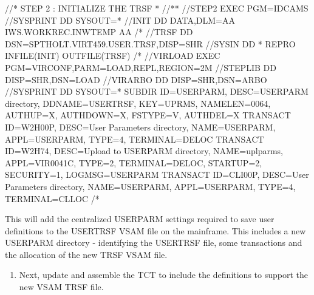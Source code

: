 \documentclass[letterpaper,10pt,english]{sphinxmanual}
\begin{document}
\begin{sphinxVerbatim}[commandchars=\\\{\}]
//* STEP 2 : INITIALIZE THE TRSF                                   *
//*\PYGZhy{}\PYGZhy{}\PYGZhy{}\PYGZhy{}\PYGZhy{}\PYGZhy{}\PYGZhy{}\PYGZhy{}\PYGZhy{}\PYGZhy{}\PYGZhy{}\PYGZhy{}\PYGZhy{}\PYGZhy{}\PYGZhy{}\PYGZhy{}\PYGZhy{}\PYGZhy{}\PYGZhy{}\PYGZhy{}\PYGZhy{}\PYGZhy{}\PYGZhy{}\PYGZhy{}\PYGZhy{}\PYGZhy{}\PYGZhy{}\PYGZhy{}\PYGZhy{}\PYGZhy{}\PYGZhy{}\PYGZhy{}\PYGZhy{}\PYGZhy{}\PYGZhy{}\PYGZhy{}\PYGZhy{}\PYGZhy{}\PYGZhy{}\PYGZhy{}\PYGZhy{}\PYGZhy{}\PYGZhy{}\PYGZhy{}\PYGZhy{}\PYGZhy{}\PYGZhy{}\PYGZhy{}\PYGZhy{}\PYGZhy{}\PYGZhy{}\PYGZhy{}\PYGZhy{}\PYGZhy{}\PYGZhy{}\PYGZhy{}\PYGZhy{}\PYGZhy{}\PYGZhy{}\PYGZhy{}\PYGZhy{}\PYGZhy{}\PYGZhy{}\PYGZhy{}*
//STEP2   EXEC PGM=IDCAMS
//SYSPRINT DD  SYSOUT=*
//INIT     DD  DATA,DLM=AA
\PYGZdl{}\PYGZdl{}\PYGZdl{}\PYGZdl{}IWS.WORKREC.INW\PYGZdl{}TEMP
AA
/*
//TRSF     DD DSN=SPTHOLT.VIRT459.USER.TRSF,DISP=SHR
//SYSIN    DD *
REPRO INFILE(INIT) OUTFILE(TRSF)
/*
//VIRLOAD EXEC PGM=VIRCONF,PARM=\PYGZsq{}LOAD,REPL\PYGZsq{},REGION=2M
//STEPLIB  DD  DISP=SHR,DSN=\PYGZam{}LOAD
//VIRARBO  DD  DISP=SHR,DSN=\PYGZam{}ARBO
//SYSPRINT DD  SYSOUT=*
      SUBDIR   ID=USERPARM,
               DESC=\PYGZsq{}USERPARM directory\PYGZsq{},
               DDNAME=USERTRSF,
               KEY=UPRMS,
               NAMELEN=0064,
               AUTHUP=X,
               AUTHDOWN=X,
               FSTYPE=V,
               AUTHDEL=X
      TRANSACT ID=W2H\PYGZhy{}00P,
               DESC=\PYGZsq{}User Parameters directory\PYGZsq{},
               NAME=USERPARM,
               APPL=USERPARM,
               TYPE=4,
               TERMINAL=DELOC
      TRANSACT ID=W2H\PYGZhy{}74,
               DESC=\PYGZsq{}Upload to USERPARM directory\PYGZsq{},
               NAME=uplparms,
               APPL=VIR0041C,
               TYPE=2,
               TERMINAL=DELOC,
               STARTUP=2,
               SECURITY=1,
               LOGMSG=USERPARM
      TRANSACT ID=CLI\PYGZhy{}00P,
               DESC=\PYGZsq{}User Parameters directory\PYGZsq{},
               NAME=USERPARM,
               APPL=USERPARM,
               TYPE=4,
               TERMINAL=CLLOC
/*
\end{sphinxVerbatim}

This will add the centralized USERPARM settings required to save user definitions to the USERTRSF VSAM file on the mainframe. This includes a new USERPARM directory - identifying the USERTRSF file, some transactions and the allocation of the new TRSF VSAM  file.
\begin{enumerate}
\def\theenumi{\arabic{enumi}}
\def\labelenumi{\theenumi .}
\makeatletter\def\p@enumii{\p@enumi \theenumi .}\makeatother
\setcounter{enumi}{1}
\item {} 
Next, update and assemble the TCT to include the definitions to support the new VSAM TRSF file.

\end{enumerate}
\end{document}

